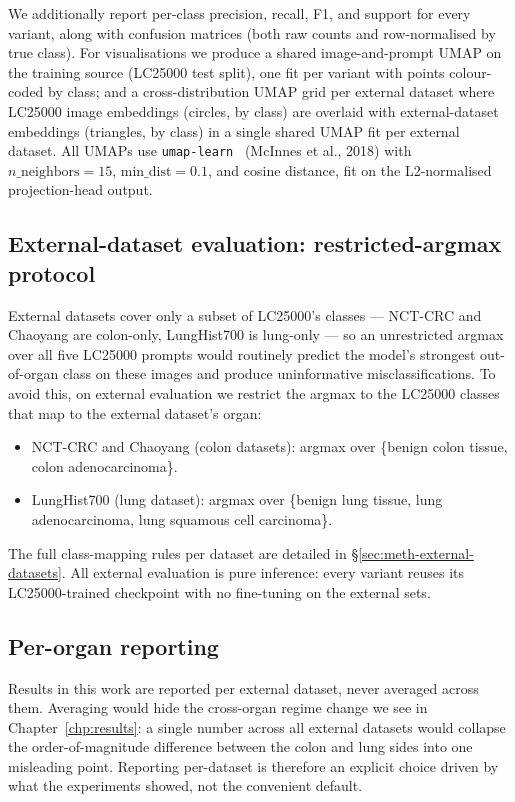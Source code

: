 We additionally report per-class precision, recall, F1, and support for every variant, along with confusion matrices (both raw counts and row-normalised by true class). For visualisations we produce a shared image-and-prompt UMAP on the training source (LC25000 test split), one fit per variant with points colour-coded by class; and a cross-distribution UMAP grid per external dataset where LC25000 image embeddings (circles, by class) are overlaid with external-dataset embeddings (triangles, by class) in a single shared UMAP fit per external dataset. All UMAPs use \texttt{umap-learn}~\cite{mcinnes2018umap} (McInnes et al., 2018) with $n\_\text{neighbors}=15$, $\text{min\_dist}=0.1$, and cosine distance, fit on the L2-normalised projection-head output.

\subsection{External-dataset evaluation: restricted-argmax protocol}
\label{sec:meth-eval-restricted}

External datasets cover only a subset of LC25000's classes --- NCT-CRC and Chaoyang are colon-only, LungHist700 is lung-only --- so an unrestricted argmax over all five LC25000 prompts would routinely predict the model's strongest out-of-organ class on these images and produce uninformative misclassifications. To avoid this, on external evaluation we restrict the argmax to the LC25000 classes that map to the external dataset's organ:

\begin{itemize}
    \item NCT-CRC and Chaoyang (colon datasets): argmax over \{benign colon tissue, colon adenocarcinoma\}.
    \item LungHist700 (lung dataset): argmax over \{benign lung tissue, lung adenocarcinoma, lung squamous cell carcinoma\}.
\end{itemize}

The full class-mapping rules per dataset are detailed in §\ref{sec:meth-external-datasets}. All external evaluation is pure inference: every variant reuses its LC25000-trained checkpoint with no fine-tuning on the external sets.

\subsection{Per-organ reporting}

Results in this work are reported per external dataset, never averaged across them. Averaging would hide the cross-organ regime change we see in Chapter~\ref{chp:results}: a single number across all external datasets would collapse the order-of-magnitude difference between the colon and lung sides into one misleading point. Reporting per-dataset is therefore an explicit choice driven by what the experiments showed, not the convenient default.


